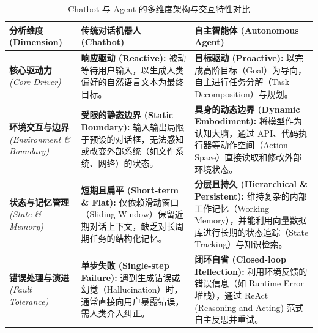 \begin{table}[htbp]
    \centering
    \caption{Chatbot 与 Agent 的多维度架构与交互特性对比}
    \label{tab:chatbot_vs_agent}
    \renewcommand{\arraystretch}{1.3}
    \begin{tabular}{@{} p{} p{} p{} @{}}
        \toprule
        \textbf{分析维度 (Dimension)} & \textbf{传统对话机器人 (Chatbot)} & \textbf{自主智能体 (Autonomous Agent)} \\
        \midrule
        \textbf{核心驱动力} \newline \textit{(Core Driver)} & 
        \textbf{响应驱动 (Reactive):} 被动等待用户输入，以生成人类偏好的自然语言文本为最终目标。 & 
        \textbf{目标驱动 (Proactive):} 以完成高阶目标（Goal）为导向，自主进行任务分解（Task Decomposition）与规划。 \\
        
        \textbf{环境交互与边界} \newline \textit{(Environment \& Boundary)} & 
        \textbf{受限的静态边界 (Static Boundary):} 输入输出局限于预设的对话框，无法感知或改变外部系统（如文件系统、网络）的状态。 & 
        \textbf{具身的动态边界 (Dynamic Embodiment):} 将模型作为认知大脑，通过 API、代码执行器等动作空间（Action Space）直接读取和修改外部环境状态。 \\
        
        \textbf{状态与记忆管理} \newline \textit{(State \& Memory)} & 
        \textbf{短期且扁平 (Short-term \& Flat):} 仅依赖滑动窗口（Sliding Window）保留近期对话上下文，缺乏对长周期任务的结构化记忆。 & 
        \textbf{分层且持久 (Hierarchical \& Persistent):} 维持复杂的内部工作记忆（Working Memory），并能利用向量数据库进行长期的状态追踪（State Tracking）与知识检索。 \\
        
        \textbf{错误处理与演进} \newline \textit{(Fault Tolerance)} & 
        \textbf{单步失败 (Single-step Failure):} 遇到生成错误或幻觉（Hallucination）时，通常直接向用户暴露错误，需人类介入纠正。 & 
        \textbf{闭环自省 (Closed-loop Reflection):} 利用环境反馈的错误信息（如 Runtime Error 堆栈），通过 ReAct (Reasoning and Acting) 范式自主反思并重试。 \\
        \bottomrule
    \end{tabular}
\end{table}